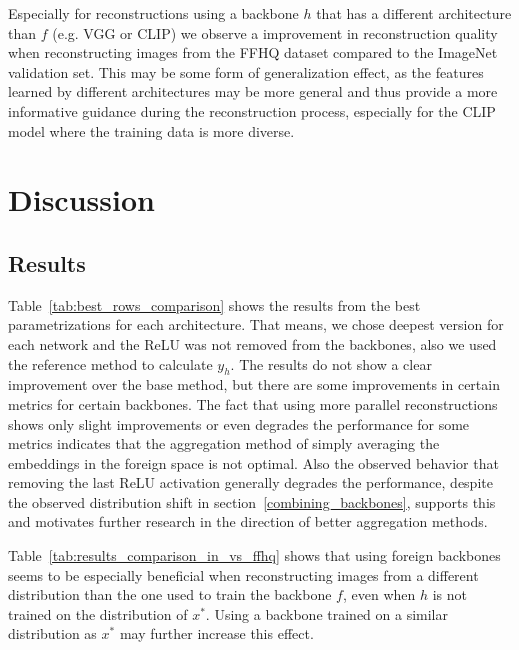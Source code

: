 \documentclass[10pt,twocolumn]{article}
\begin{document}
Especially for reconstructions using a backbone $h$ that has a different architecture than $f$ (e.g. VGG or CLIP) we observe a improvement in reconstruction quality when reconstructing images from the FFHQ dataset compared to the ImageNet validation set.
This may be some form of generalization effect, as the features learned by different architectures may be more general and thus provide a more informative guidance during the reconstruction process, especially for the CLIP model where the training data is more diverse.
\section{Discussion}
\subsection{Results}
Table~\ref{tab:best_rows_comparison} shows the results from the best parametrizations for each architecture.
That means, we chose deepest version for each network and the ReLU was not removed from the backbones, also we used the reference method to calculate $y_h$.
The results do not show a clear improvement over the base method, but there are some improvements in certain metrics for certain backbones.
The fact that using more parallel reconstructions shows only slight improvements or even degrades the performance for some metrics indicates that the aggregation method of simply averaging the embeddings in the foreign space is not optimal.
Also the observed behavior that removing the last ReLU activation generally degrades the performance, despite the observed distribution shift in section~\ref{combining_backbones}, supports this and motivates further research in the direction of better aggregation methods.

Table~\ref{tab:results_comparison_in_vs_ffhq} shows that using foreign backbones seems to be especially beneficial when reconstructing images from a different distribution than the one used to train the backbone $f$, even when $h$ is not trained on the distribution of $x^*$.
Using a backbone trained on a similar distribution as $x^*$ may further increase this effect.
\end{document}
